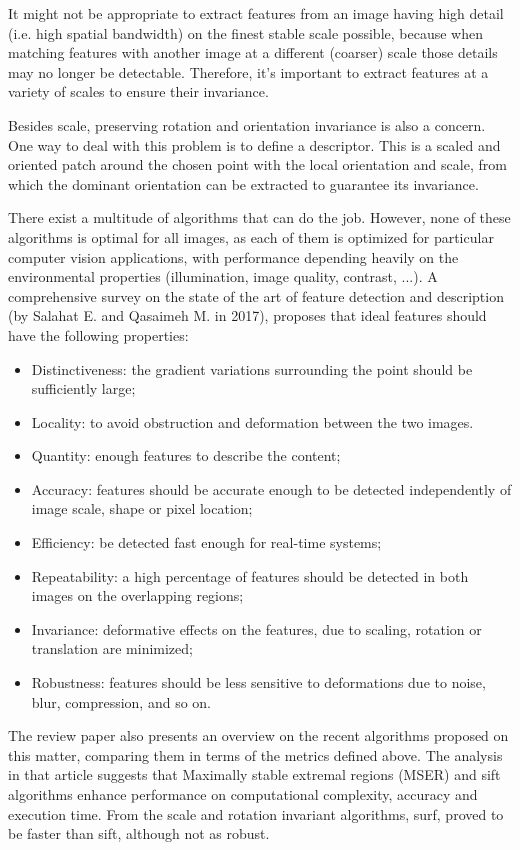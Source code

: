 It might not be appropriate to extract features from an image having high detail (i.e. high spatial bandwidth) on the finest stable scale possible, because when matching features with another image at a different (coarser) scale those details may no longer be detectable. Therefore, it's important to extract features at a variety of scales to ensure their invariance. 

Besides scale, preserving rotation and orientation invariance is also a concern. One way to deal with this problem is to define a descriptor. This is a scaled and oriented patch around the chosen point with the local orientation and scale, from which the dominant orientation can be extracted to guarantee its invariance. \cite{multiview}

There exist a multitude of algorithms that can do the job. However, none of these algorithms is optimal for all images, as each of them is optimized for particular computer vision applications, with performance depending heavily on the environmental properties (illumination, image quality, contrast, ...). A comprehensive survey on the state of the art of feature detection and description  \cite{featsift} (by Salahat E. and Qasaimeh M. in 2017), proposes that ideal features should have the following properties:
\begin{itemize}
	\item Distinctiveness: the gradient variations surrounding the point should be sufficiently large;
	\item Locality: to avoid obstruction and deformation between the two images.
	\item Quantity: enough features to describe the content;
	\item Accuracy: features should be accurate enough to be detected independently of image scale, shape or pixel location;
	\item Efficiency: be detected fast enough for real-time systems;
	\item Repeatability: a high percentage of features should be detected in both images on the overlapping regions;
	\item Invariance: deformative effects on the features, due to scaling, rotation or translation are minimized;
	\item Robustness: features should be less sensitive to deformations due to noise, blur, compression, and so on.
\end{itemize} 
The review paper also presents an overview on the recent algorithms proposed on this matter, comparing them in terms of the metrics defined above. The analysis in that article suggests that Maximally stable extremal regions (MSER) and \acrfull{sift} algorithms enhance performance on computational complexity, accuracy and execution time. From the scale and rotation invariant algorithms, \acrfull{surf}, proved to be faster than \acrshort{sift}, although not as robust.

